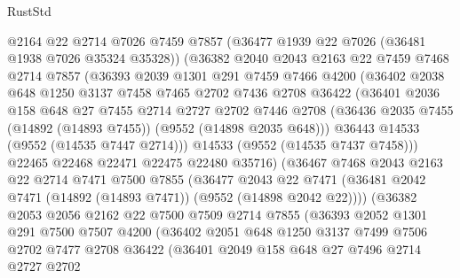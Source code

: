 \begin{lexlean}{RustStd}
\begin{coremodule}
          @2164
          @22
          @2714
          @7026
          @7459
          @7857
          (@36477 @1939 @22 @7026 (@36481 @1938 @7026 @35324 @35328))
          (@36382
            @2040
            @2043
            @2163
            @22
            @7459
            @7468
            @2714
            @7857
            (@36393
              @2039
              @1301
              @291
              @7459
              @7466
              @4200
              (@36402
                @2038
                @648
                @1250
                @3137
                @7458
                @7465
                @2702
                @7436
                @2708
                @36422
                (@36401
                  @2036
                  @158
                  @648
                  @27
                  @7455
                  @2714
                  @2727
                  @2702
                  @7446
                  @2708
                  (@36436 @2035 @7455 (@14892 (@14893 @7455)) (@9552 (@14898 @2035 @648)))
                  @36443
                  @14533
                  (@9552 (@14535 @7447 @2714)))
                @14533
                (@9552 (@14535 @7437 @7458)))
              @22465
              @22468
              @22471
              @22475
              @22480
              @35716)
            (@36467
              @7468
              @2043
              @2163
              @22
              @2714
              @7471
              @7500
              @7855
              (@36477
                @2043
                @22
                @7471
                (@36481 @2042 @7471 (@14892 (@14893 @7471)) (@9552 (@14898 @2042 @22))))
              (@36382
                @2053
                @2056
                @2162
                @22
                @7500
                @7509
                @2714
                @7855
                (@36393
                  @2052
                  @1301
                  @291
                  @7500
                  @7507
                  @4200
                  (@36402
                    @2051
                    @648
                    @1250
                    @3137
                    @7499
                    @7506
                    @2702
                    @7477
                    @2708
                    @36422
                    (@36401
                      @2049
                      @158
                      @648
                      @27
                      @7496
                      @2714
                      @2727
                      @2702

\end{coremodule}
\end{lexlean}
